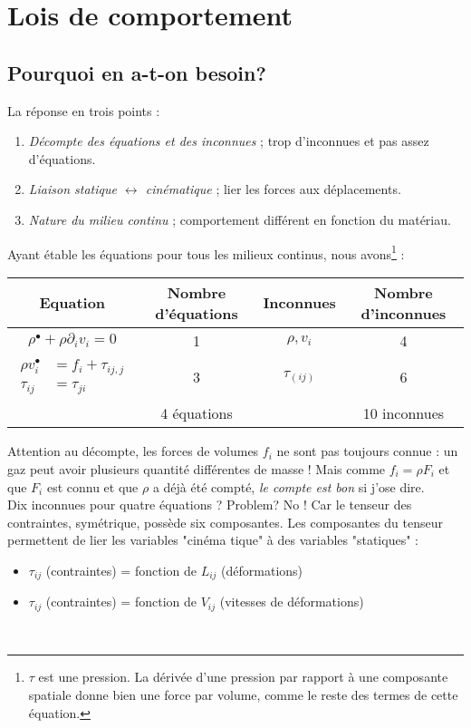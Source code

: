 \chapter{Lois de comportement}
\label{ch:ch5}

\section{Pourquoi en a-t-on besoin?}
La réponse en trois points :
\begin{enumerate}
\item \textit{Décompte des équations et des inconnues} ; trop d'inconnues et pas assez d'équations.
\item \textit{Liaison statique $\leftrightarrow$ cinématique} ; lier les forces aux déplacements.
\item \textit{Nature du milieu continu} ; comportement différent en fonction du matériau.
\end{enumerate}
Ayant étable les équations pour tous les milieux continus, nous avons\footnote{$\tau$ est une 
pression. La dérivée d'une pression par rapport à une composante spatiale donne bien une force par
volume, comme le reste des termes de cette équation.} :

\begin{center}
\begin{tabular}{|c|c|c|c|}
    \hline
    \textbf{Equation} & \textbf{Nombre d'équations} & \textbf{Inconnues}  & \textbf{Nombre 
    d'inconnues}\\
    \hline
    $\rho^\bullet + \rho\partial_i v_i = 0$ & 1 & $\rho,v_i$ & 4\\
    \hline
    $\begin{array}{ll}
    \rho v_i^\bullet &= f_i + \tau_{ij,j}\\
    \tau_{ij} &= \tau_{ji}
    \end{array}$ & 3 & $\tau_{(ij)}$ & 6\\
    \hline
     & 4 équations & & 10 inconnues\\
     \hline
\end{tabular}
\end{center}
Attention au décompte, les forces de volumes $f_i$ ne sont pas toujours connue : un gaz peut
avoir plusieurs quantité différentes de masse ! Mais comme $f_i = \rho F_i$ et que $F_i$ est
connu et que $\rho$ a déjà été compté, \textit{le compte est bon} si j'ose dire.\\

Dix inconnues pour quatre équations ? Problem? No ! Car le tenseur des contraintes, symétrique,
possède six composantes. Les composantes du tenseur permettent de lier les variables "cinéma
tique" à des variables "statiques" :
\begin{itemize}
\item $\tau_{ij}$ (contraintes) = fonction de $L_{ij}$ (déformations)
\item $\tau_{ij}$ (contraintes) = fonction de $V_{ij}$ (vitesses de déformations)
\end{itemize}\ \\

